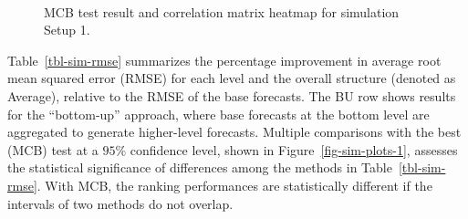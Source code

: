 \documentclass[
  11pt]{article}
\theoremstyle{plain}
\theoremstyle{remark}
\begin{document}
\begin{figure}

\begin{minipage}{0.48\linewidth}



\end{minipage}%
%
\begin{minipage}{0.04\linewidth}
~\end{minipage}%
%
\begin{minipage}{0.48\linewidth}



\end{minipage}%

\caption{\label{fig-sim-plots}MCB test result and correlation matrix
heatmap for simulation Setup 1.}

\end{figure}%

Table~\ref{tbl-sim-rmse} summarizes the percentage improvement in
average root mean squared error (RMSE) for each level and the overall
structure (denoted as Average), relative to the RMSE of the base
forecasts. The BU row shows results for the ``bottom-up'' approach,
where base forecasts at the bottom level are aggregated to generate
higher-level forecasts. Multiple comparisons with the best (MCB) test at
a \(95\%\) confidence level, shown in Figure~\ref{fig-sim-plots-1},
assesses the statistical significance of differences among the methods
in Table~\ref{tbl-sim-rmse}. With MCB, the ranking performances are
statistically different if the intervals of two methods do not overlap.
\end{document}
